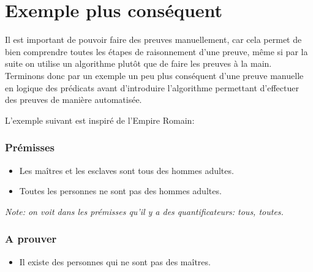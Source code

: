 
\section{Exemple plus conséquent}

Il est important de pouvoir faire des preuves manuellement, car cela permet de bien comprendre toutes les étapes de raisonnement
d'une preuve, même si par la suite on utilise un algorithme plutôt que de faire les preuves à la main. 
Terminons donc par un exemple un peu plus conséquent d'une preuve manuelle en logique des prédicats avant d'introduire
l'algorithme permettant d'effectuer des preuves de manière automatisée.

L'exemple suivant est inspiré de l'Empire Romain: 
\subsubsection{Prémisses}
\begin{itemize}
    \item Les maîtres et les esclaves sont tous des hommes adultes.
    \item Toutes les personnes ne sont pas des hommes adultes.
\end{itemize}
\textit{Note: on voit dans les prémisses qu'il y a des quantificateurs: tous, toutes.}

\subsubsection{A prouver} 
\begin{itemize}
    \item Il existe des personnes qui ne sont pas des maîtres.
\end{itemize}

